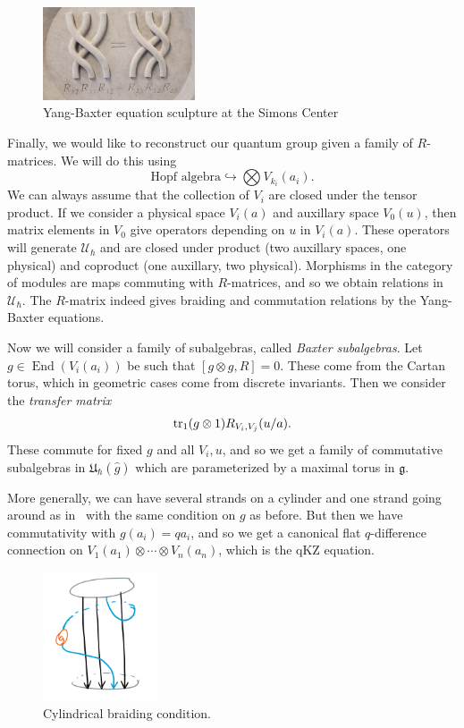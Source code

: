 \documentclass[leqno, openany]{memoir}
\theoremstyle{definition}
\theoremstyle{remark}
\theoremstyle{plain}
\theoremstyle{definition}
\theoremstyle{remark}
\newcommand{\mc}[1]{\mathcal{#1}}
\newcommand{\mf}[1]{\mathfrak{#1}}
\newcommand{\wh}[1]{\widehat{#1}}
\DeclareMathOperator{\End}{End}
\begin{document}
\begin{figure}[h]
    \centering
    \includegraphics[width=0.4\textwidth]{ybe}
    \caption{Yang-Baxter equation sculpture at the Simons Center}
    \label{fig:ybe}
\end{figure}

Finally, we would like to reconstruct our quantum group given a family of $R$-matrices. We will do this using
\[ \text{Hopf algebra} \hookrightarrow \bigotimes V_{k_i}(a_i). \]
We can always assume that the collection of $V_i$ are closed under the tensor product. If we consider a physical space $V_i(a)$ and auxillary space $V_0(u)$, then matrix elements in $V_0$ give operators depending on $u$ in $V_i(a)$. These operators will generate $\mc{U}_{\hslash}$ and are closed under product (two auxillary spaces, one physical) and coproduct (one auxillary, two physical). Morphisms in the category of modules are maps commuting with $R$-matrices, and so we obtain relations in $\mc{U}_{\hslash}$. The $R$-matrix indeed gives braiding and commutation relations by the Yang-Baxter equations.

Now we will consider a family of subalgebras, called \textit{Baxter subalgebras}. Let $g \in \End(V_i(a_i))$ be such that $[g \otimes g, R] = 0$. These come from the Cartan torus, which in geometric cases come from discrete invariants. Then we consider the \textit{transfer matrix}
\[ \tr_1 (g \otimes 1) R_{V_i, V_j}(u/a). \]
These commute for fixed $g$ and all $V_i, u$, and so we get a family of commutative subalgebras in $\mf{U}_{\hslash}(\wh{g})$ which are parameterized by a maximal torus in $\mf{g}$.

More generally, we can have several strands on a cylinder and one strand going around as in~ with the same condition on $g$ as before. But then we have commutativity with $g(a_i) = q a_i$, and so we get a canonical flat $q$-difference connection on $V_1(a_1) \otimes \cdots \otimes V_n(a_n)$, which is the qKZ equation.

\begin{figure}[h]
    \centering
    \includegraphics[width=0.3\textwidth]{cylbraid}
    \caption{Cylindrical braiding condition.}
    \label{fig:cylbraid}
\end{figure}
\end{document}
